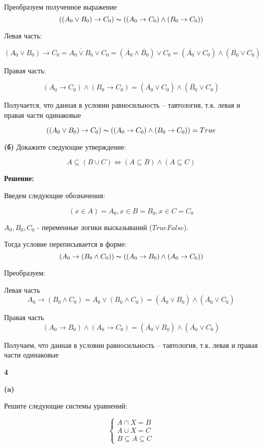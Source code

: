 \documentclass{article}
\begin{document}
Преобразуем полученное выражение
$$((A_0 \vee B_0) \rightarrow C_0) \thicksim ((A_0 \rightarrow C_0) \wedge (B_0 \rightarrow C_0)) $$

Левая часть:

$$(A_0 \vee B_0) \rightarrow C_0 = \overline{A_0 \vee B_0} \vee C_0 = (\overline{A_0} \wedge \overline{B_0}) \vee C_0 = (\overline{A_0} \vee C_0) \wedge (\overline{B_0} \vee C_0)$$

Правая часть:

$$(A_0 \rightarrow C_0) \wedge (B_0 \rightarrow C_0) = (\overline{A_0} \vee C_0) \wedge (\overline{B_0} \vee C_0)$$

Получается, что данная в условии равносильность -- тавтология, т.к. левая и правая части одинаковые 

$$((A_0 \vee B_0) \rightarrow C_0) \thicksim ((A_0 \rightarrow C_0) \wedge (B_0 \rightarrow C_0)) = True $$

\textbf{(б)}
Докажите следующие утверждение:

$$ A \subseteq (B \cup C) \iff (A \subseteq B) \wedge (A \subseteq C) $$

\textbf{Решение:}


Введем следующие обозначения: 

$$ (x \in A) = A_0, x \in B = B_0, x \in C = C_0$$

$A_0, B_0, C_0$ - переменные логики высказываний ($True False$). 

Тогда условие переписывается в форме:
$$(A_0 \rightarrow (B_0 \wedge C_0)) \thicksim ((A_0 \rightarrow B_0) \wedge (A_0 \rightarrow C_0)) $$

Преобразуем:

Левая часть
$$A_0 \rightarrow (B_0 \wedge C_0) = \overline{A_0} \vee (B_0 \wedge C_0) = (\overline{A_0} \vee B_0) \wedge (\overline{A_0} \vee C_0) $$

Правая часть
$$(A_0 \rightarrow B_0) \wedge (A_0 \rightarrow C_0) = (\overline{A_0} \vee B_0) \wedge (\overline{A_0} \vee C_0) $$

Получаем, что данная в условии равносильность -- тавтология, т.к. левая и правая части одинаковые 

\textbf{4}

\textbf{(a)}

Решите следующие системы уравнений:

$$\begin{cases} A \cap X = B \\ A \cup X = C \\ B \subseteq A \subseteq C \end{cases}$$
\end{document}
